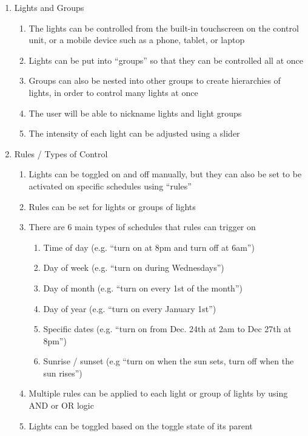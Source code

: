 \begin{enumerate}
    \item Lights and Groups
    \begin{enumerate}
        \item The lights can be controlled from the built-in touchscreen on the
            control unit, or a mobile device such as a phone, tablet, or laptop
        \item Lights can be put into ``groups'' so that they can be controlled
            all at once
        \item Groups can also be nested into other groups to create hierarchies
            of lights, in order to control many lights at once
        \item The user will be able to nickname lights and light groups
        \item The intensity of each light can be adjusted using a slider
    \end{enumerate}
    \item Rules / Types of Control
    \begin{enumerate}
        \item Lights can be toggled on and off manually, but they can also be
            set to be activated on specific schedules using ``rules''
        \item Rules can be set for lights or groups of lights
        \item There are 6 main types of schedules that rules can trigger on
        \begin{enumerate}
            \item Time of day (e.g. ``turn on at 8pm and turn off at 6am'')
            \item Day of week (e.g. ``turn on during Wednesdays'')
            \item Day of month (e.g. ``turn on every 1st of the month'')
            \item Day of year (e.g. ``turn on every January 1st'')
            \item Specific dates (e.g. ``turn on from Dec. 24th at 2am to Dec
                27th at 8pm'')
            \item Sunrise / sunset (e.g ``turn on when the sun sets, turn off
                when the sun rises'')
        \end{enumerate}
        \item Multiple rules can be applied to each light or group of lights by
            using AND or OR logic
        \item Lights can be toggled based on the toggle state of its parent

\end{enumerate}
\end{enumerate}
